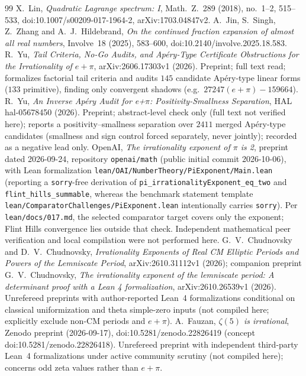 \documentclass[11pt]{amsart}
\theoremstyle{definition}
\theoremstyle{remark}
\numberwithin{equation}{section}
\begin{document}
\begin{thebibliography}{99}
 X.~Lin, \emph{Quadratic Lagrange spectrum: I}, Math.~Z.~289 (2018), no.~1--2, 515--533, doi:10.1007/s00209-017-1964-2, arXiv:1703.04847v2.
 A.~Jin, S.~Singh, Z.~Zhang and A.~J.~Hildebrand, \emph{On the continued fraction expansion of almost all real numbers}, Involve~18 (2025), 583--600, doi:10.2140/involve.2025.18.583.
 R.~Yu, \emph{Tail Criteria, No-Go Audits, and Ap\'ery-Type Certificate Obstructions for the Irrationality of $e+\pi$}, arXiv:2606.17303v1 (2026). Preprint; full text read; formalizes factorial tail criteria and audits $145$ candidate Ap\'ery-type linear forms ($133$ primitive), finding only convergent shadows (e.g.\ $27247(e+\pi)-159664$).
 R.~Yu, \emph{An Inverse Ap\'ery Audit for e+$\pi$: Positivity-Smallness Separation}, HAL hal-05678450 (2026). Preprint; abstract-level check only (full text not verified here); reports a positivity--smallness separation over $2411$ merged Ap\'ery-type candidates (smallness and sign control forced separately, never jointly); recorded as a negative lead only.
 OpenAI, \emph{The irrationality exponent of $\pi$ is 2}, preprint dated 2026-09-24, repository \texttt{openai/math} (public initial commit 2026-10-06), with Lean formalization \texttt{lean/OAI/NumberTheory/PiExponent/Main.lean} (reporting a \texttt{sorry}-free derivation of \texttt{pi\_irrationalityExponent\_eq\_two} and \texttt{flint\_hills\_summable}, whereas the benchmark statement template \texttt{lean/ComparatorChallenges/PiExponent.lean} intentionally carries \texttt{sorry}). Per \texttt{lean/docs/017.md}, the selected comparator target covers only the exponent; Flint Hills convergence lies outside that check. Independent mathematical peer verification and local compilation were not performed here.
 G.~V.~Chudnovsky and D.~V.~Chudnovsky, \emph{Irrationality Exponents of Real CM Elliptic Periods and Powers of the Lemniscate Period}, arXiv:2610.31112v1 (2026); companion preprint G.~V.~Chudnovsky, \emph{The irrationality exponent of the lemniscate period: A determinant proof with a Lean 4 formalization}, arXiv:2610.26539v1 (2026). Unrefereed preprints with author-reported Lean~4 formalizations conditional on classical uniformization and theta simple-zero inputs (not compiled here; explicitly exclude non-CM periods and $e+\pi$).
 A.~Fauzan, \emph{$\zeta(5)$ is irrational}, Zenodo preprint (2026-09-17), doi:10.5281/zenodo.22826419 (concept doi:10.5281/zenodo.22826418). Unrefereed preprint with independent third-party Lean~4 formalizations under active community scrutiny (not compiled here); concerns odd zeta values rather than $e+\pi$.

\end{thebibliography}
\end{document}
